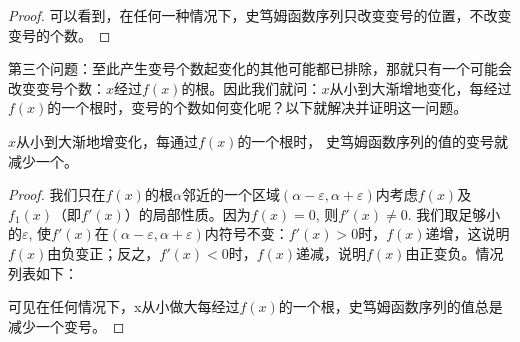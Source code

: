 \begin{proof}
可以看到，在任何一种情况下，史笃姆函数序列只改变变号的位置，不改变变号的个数。
\end{proof}

第三个问题：至此产生变号个数起变化的其他可能都已排除，那就只有一个可能会改变变号个数：$x$经过$f(x)$的根。因此我们就问：$x$从小到大渐增地变化，每经过$f(x)$的一个根时，变号的个数如何变化呢？以下就解决并证明这一问题。

\begin{blk}{}
$x$从小到大渐地增变化，每通过$f(x)$的一个根时，
史笃姆函数序列的值的变号就减少一个。
\end{blk}

\begin{proof}
我们只在$f(x)$的根$\alpha$邻近的一个区域$(\alpha-\varepsilon,\alpha+\varepsilon)$内考虑$f(x)$及$f_1(x)$（即$f'(x)$）的局部性质。因为$f(x)=0$, 
则$f'(x)\ne 0$. 我们取足够小的$\varepsilon$, 使$f'(x)$在$(\alpha-\varepsilon,\alpha+\varepsilon)$内符号不变：$f'(x)>0$时，$f(x)$递增，这说明$f(x)$由负变正；反之，$f'(x)<0$时，$f(x)$递减，说明$f(x)$由正变负。情况列表如下：
\begin{center}
    \end{center}

可见在任何情况下，x从小做大每经过$f(x)$的一个根，史笃姆函数序列的值总是减少一个变号。
\end{proof}

